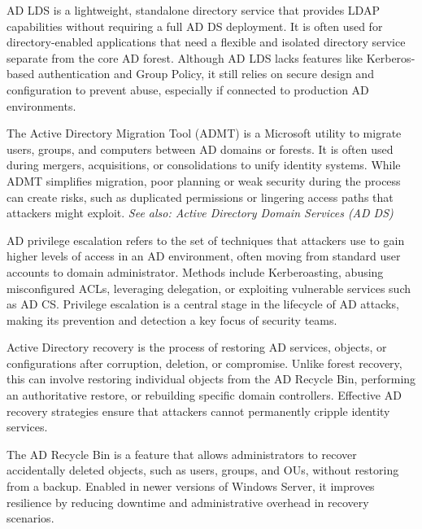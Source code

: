  AD LDS is a lightweight, standalone directory service that provides LDAP capabilities without requiring a full AD DS deployment. It is often used for directory-enabled applications that need a flexible and isolated directory service separate from the core AD forest. Although AD LDS lacks features like Kerberos-based authentication and Group Policy, it still relies on secure design and configuration to prevent abuse, especially if connected to production AD environments.

 The Active Directory Migration Tool (ADMT) is a Microsoft utility to migrate users, groups, and computers between AD domains or forests. It is often used during mergers, acquisitions, or consolidations to unify identity systems. While ADMT simplifies migration, poor planning or weak security during the process can create risks, such as duplicated permissions or lingering access paths that attackers might exploit.
\textit{See also: Active Directory Domain Services (AD DS)}

 AD privilege escalation refers to the set of techniques that attackers use to gain higher levels of access in an AD environment, often moving from standard user accounts to domain administrator. Methods include Kerberoasting, abusing misconfigured ACLs, leveraging delegation, or exploiting vulnerable services such as AD CS. Privilege escalation is a central stage in the lifecycle of AD attacks, making its prevention and detection a key focus of security teams.

 Active Directory recovery is the process of restoring AD services, objects, or configurations after corruption, deletion, or compromise. Unlike forest recovery, this can involve restoring individual objects from the AD Recycle Bin, performing an authoritative restore, or rebuilding specific domain controllers. Effective AD recovery strategies ensure that attackers cannot permanently cripple identity services.

  The AD Recycle Bin is a feature that allows administrators to recover accidentally deleted objects, such as users, groups, and OUs, without restoring from a backup. Enabled in newer versions of Windows Server, it improves resilience by reducing downtime and administrative overhead in recovery scenarios.

